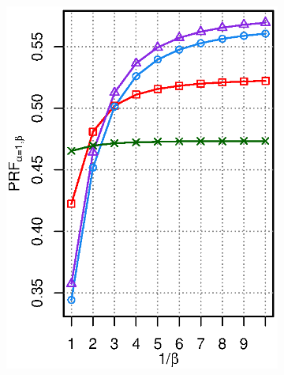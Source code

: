 \begin{figure}[ht!]
\begin{subfigure}[b]{0.45\columnwidth}
\includegraphics[width=\columnwidth]{figure/qf13-qfj-prfaf-ll-prf.eps}
\caption{\QFJ}
\end{subfigure}
\end{figure}

